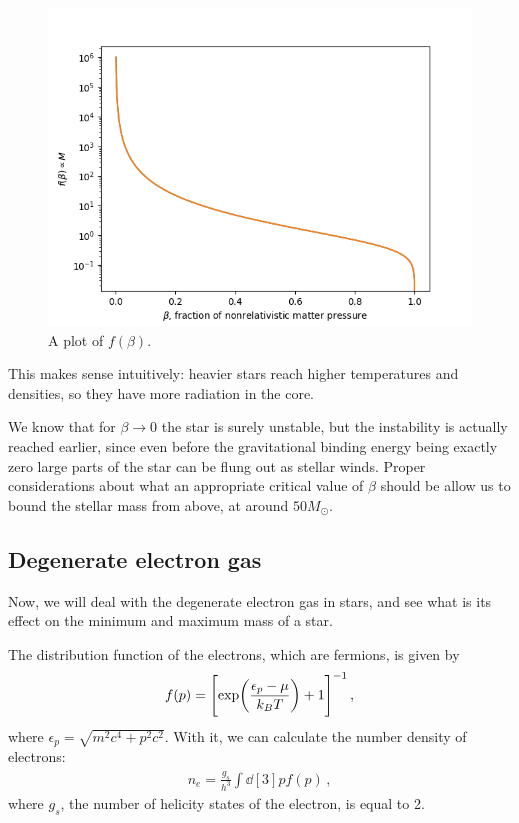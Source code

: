 \documentclass[main.tex]{subfiles}
\begin{document}
\begin{figure}[ht]
\centering
\includegraphics[width=\textwidth]{figures/beta_star_core_pressure.png}
\caption{A plot of \(f(\beta )\).}
\label{fig:beta-core-pressure}
\end{figure}

This makes sense intuitively: heavier stars reach higher temperatures and densities, so they have more radiation in the core. 

We know that for \(\beta \to 0\) the star is surely unstable, but the instability is actually reached earlier, since even before the gravitational binding energy being exactly zero large parts of the star can be flung out as stellar winds.
Proper considerations about what an appropriate critical value of \(\beta \) should be allow us to bound the stellar mass from above, at around \(50 M_{\odot}\). 


\subsection{Degenerate electron gas}

Now, we will deal with the degenerate electron gas in stars, and see what is its effect on the minimum and maximum mass of a star.  

The distribution function of the electrons, which are fermions, is given by 
%
\begin{align}
  f(p) = \qty[\exp(\frac{\epsilon _p - \mu }{k_B T})+1]^{-1}
\,,
\end{align}
%
where \(\epsilon _p = \sqrt{m^2 c^{4} + p^2 c^2}\). With it, we can calculate the number density of electrons: 
%
\begin{align}
n_e = \frac{g_s}{h^3} \int \dd[3]{p} f(p)
\,,
\end{align}
%
where \(g_s\), the number of helicity states of the electron, is equal to 2.
\end{document}
